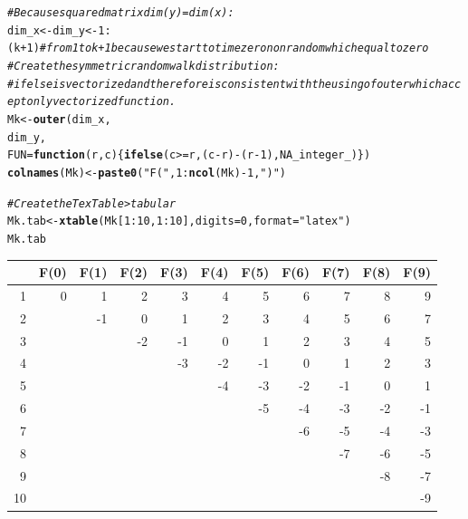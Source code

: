 \documentclass{article}\usepackage[]{graphicx}\usepackage[]{color}
\makeatletter
\newcommand{\hlnum}[1]{\textcolor[rgb]{0.686,0.059,0.569}{#1}}%
\newcommand{\hlstr}[1]{\textcolor[rgb]{0.192,0.494,0.8}{#1}}%
\newcommand{\hlcom}[1]{\textcolor[rgb]{0.678,0.584,0.686}{\textit{#1}}}%
\newcommand{\hlopt}[1]{\textcolor[rgb]{0,0,0}{#1}}%
\newcommand{\hlstd}[1]{\textcolor[rgb]{0.345,0.345,0.345}{#1}}%
\newcommand{\hlkwa}[1]{\textcolor[rgb]{0.161,0.373,0.58}{\textbf{#1}}}%
\newcommand{\hlkwb}[1]{\textcolor[rgb]{0.69,0.353,0.396}{#1}}%
\newcommand{\hlkwc}[1]{\textcolor[rgb]{0.333,0.667,0.333}{#1}}%
\newcommand{\hlkwd}[1]{\textcolor[rgb]{0.737,0.353,0.396}{\textbf{#1}}}%
\newenvironment{kframe}{%
 \def\at@end@of@kframe{}%
 \ifinner\ifhmode%
  \def\at@end@of@kframe{\end{minipage}}%
  \begin{minipage}{\columnwidth}%
 \fi\fi%
 \def\FrameCommand##1{\hskip\@totalleftmargin \hskip-\fboxsep
 \colorbox{shadecolor}{##1}\hskip-\fboxsep
     \hskip-\linewidth \hskip-\@totalleftmargin \hskip\columnwidth}%
 \MakeFramed {\advance\hsize-\width
   \@totalleftmargin\z@ \linewidth\hsize
   \@setminipage}}%
 {\par\unskip\endMakeFramed%
 \at@end@of@kframe}
\makeatother
\begin{document}
\begin{kframe}
\begin{alltt}
\hlcom{# Because squared matrix dim(y) = dim(x):}
\hlstd{dim_x} \hlkwb{<-} \hlstd{dim_y} \hlkwb{<-} \hlnum{1}\hlopt{:}\hlstd{(k} \hlopt{+} \hlnum{1}\hlstd{)} \hlcom{# from 1 to k+1 because we start to time zero nonrandom which equal to zero}
\hlcom{# Create the symmetric random walk distribution:}
\hlcom{# ifelse is vectorized and therefore is consistent with the using of outer which accept only vectorized function.}
\hlstd{Mk} \hlkwb{<-} \hlkwd{outer}\hlstd{(dim_x,}
           \hlstd{dim_y,}
           \hlkwc{FUN}\hlstd{=}\hlkwa{function}\hlstd{(}\hlkwc{r}\hlstd{,}\hlkwc{c}\hlstd{)\{}\hlkwd{ifelse}\hlstd{(c}\hlopt{>=}\hlstd{r, (c}\hlopt{-}\hlstd{r)} \hlopt{-} \hlstd{(r}\hlopt{-}\hlnum{1}\hlstd{),} \hlnum{NA_integer_}\hlstd{)\})}
\hlkwd{colnames}\hlstd{(Mk)} \hlkwb{<-} \hlkwd{paste0}\hlstd{(}\hlstr{"F("}\hlstd{,} \hlnum{1}\hlopt{:}\hlkwd{ncol}\hlstd{(Mk)} \hlopt{-} \hlnum{1}\hlstd{,} \hlstr{")"}\hlstd{)}

\hlcom{# Create the Tex Table > tabular}
\hlstd{Mk.tab} \hlkwb{<-} \hlkwd{xtable}\hlstd{(Mk[}\hlnum{1}\hlopt{:}\hlnum{10}\hlstd{,} \hlnum{1}\hlopt{:}\hlnum{10}\hlstd{],} \hlkwc{digits} \hlstd{=} \hlnum{0}\hlstd{,} \hlkwc{format} \hlstd{=} \hlstr{"latex"}\hlstd{)}
\hlstd{Mk.tab}
\end{alltt}
\end{kframe}%
\begin{table}[ht]
\centering
\begin{tabular}{rrrrrrrrrrr}
  \hline
 & F(0) & F(1) & F(2) & F(3) & F(4) & F(5) & F(6) & F(7) & F(8) & F(9) \\ 
  \hline
1 & 0 & 1 & 2 & 3 & 4 & 5 & 6 & 7 & 8 & 9 \\ 
  2 &  & -1 & 0 & 1 & 2 & 3 & 4 & 5 & 6 & 7 \\ 
  3 &  &  & -2 & -1 & 0 & 1 & 2 & 3 & 4 & 5 \\ 
  4 &  &  &  & -3 & -2 & -1 & 0 & 1 & 2 & 3 \\ 
  5 &  &  &  &  & -4 & -3 & -2 & -1 & 0 & 1 \\ 
  6 &  &  &  &  &  & -5 & -4 & -3 & -2 & -1 \\ 
  7 &  &  &  &  &  &  & -6 & -5 & -4 & -3 \\ 
  8 &  &  &  &  &  &  &  & -7 & -6 & -5 \\ 
  9 &  &  &  &  &  &  &  &  & -8 & -7 \\ 
  10 &  &  &  &  &  &  &  &  &  & -9 \\ 
   \hline
\end{tabular}
\end{table}
\end{document}
